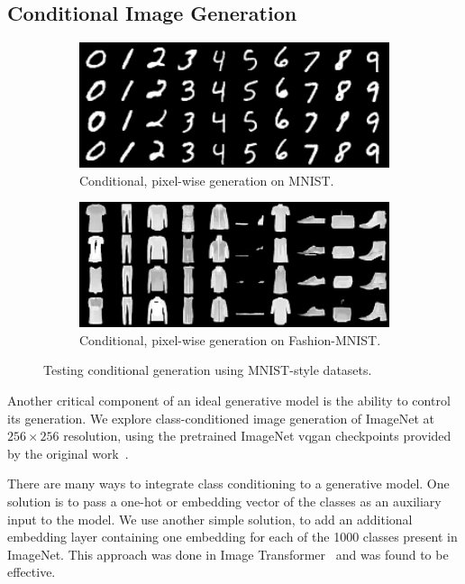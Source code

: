 \subsection{Conditional Image Generation}

\begin{figure}[ht]
    \centering
    \begin{subfigure}[b]{0.47\textwidth}
        \centering
        \includegraphics[width=1.0\textwidth]{figures/mnist-samples.png}
        \caption{
            Conditional, pixel-wise generation on MNIST.
        }
    \end{subfigure}
    \hfill
    \begin{subfigure}[b]{0.47\textwidth}
        \centering
        \includegraphics[width=1.0\textwidth]{figures/fashionmnist-samples.png}
        \caption{
            Conditional, pixel-wise generation on Fashion-MNIST.
        }
    \end{subfigure}
    \caption{Testing conditional generation using MNIST-style datasets.}
    \label{fig:mnist}
\end{figure}

Another critical component of an ideal generative model is the ability to
control its generation. We explore class-conditioned image generation of
ImageNet at $256 \times 256$ resolution, using the pretrained ImageNet
\gls{vqgan} checkpoints provided by the original work~\cite{esser2021taming}. 

There are many ways to integrate class conditioning to a generative model. One
solution is to pass a one-hot or embedding vector of the classes as an auxiliary
input to the model. We use another simple solution, to add an additional
embedding layer containing one embedding for each of the 1000 classes present in
ImageNet. This approach was done in Image Transformer~\cite{parmar2018image} and
was found to be effective. 

